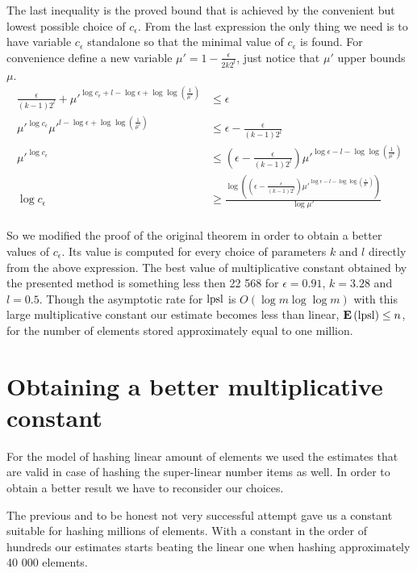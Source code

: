 The last inequality is the proved bound that is achieved by the convenient but lowest possible choice of $c_\epsilon$. From the last expression the only thing we need is to have variable $c_\epsilon$ standalone so that the minimal value of $c_\epsilon$ is found. For convenience define a new variable $\mu' = 1 - \frac{\epsilon}{2 k 2 ^l}$, just notice that $\mu'$ upper bounds $\mu$.
\[
\begin{split}
\frac{\epsilon}{(k - 1) 2 ^ l} + {\mu'}^{\log c_\epsilon + l - \log \epsilon + \log \log \left(\frac{1}{\mu'}\right)} & \leq \epsilon \\
{\mu'}^{\log c_\epsilon}{\mu'}^{l - \log \epsilon + \log \log \left(\frac{1}{\mu'}\right)} & \leq \epsilon - \frac{\epsilon}{(k - 1) 2 ^ l} \\
{\mu'}^{\log c_\epsilon} & \leq \left(\epsilon - \frac{\epsilon}{(k - 1) 2 ^ l}\right) {\mu'}^{\log \epsilon - l - \log \log \left(\frac{1}{\mu'}\right)} \\
{\log c_\epsilon} & \geq \frac{\log \left( \left( \epsilon - \frac{\epsilon}{(k - 1) 2 ^ l}\right) {\mu'}^{\log \epsilon - l - \log \log \left(\frac{1}{\mu'}\right)}\right)}{\log \mu'}  \\
\end{split}
\]

So we modified the proof of the original theorem in order to obtain a better values of $c_\epsilon$. Its value is computed for every choice of parameters $k$ and $l$ directly from the above expression. The best value of multiplicative constant obtained by the presented method is something less then 22 568 for $\epsilon = 0.91$, $k = 3.28$ and $l = 0.5$. Though the asymptotic rate for $\mathrm{lpsl}$ is $O(\log m \log \log m)$ with this large multiplicative constant our estimate becomes less than linear, $\mathbf{E}\left(\mathrm{lpsl}\right) \leq n$, for the number of elements stored approximately equal to one million.

\section{Obtaining a better multiplicative constant}
For the model of hashing linear amount of elements we used the estimates that are valid in case of hashing the super-linear number items as well. In order to obtain a better result we have to reconsider our choices. 

The previous and to be honest not very successful attempt gave us a constant suitable for hashing millions of elements. With a constant in the order of hundreds our estimates starts beating the linear one when hashing approximately 40 000 elements.

